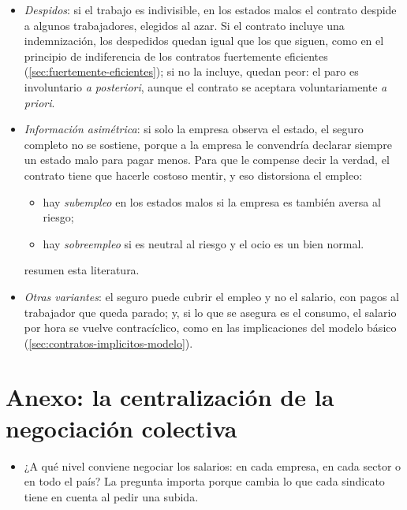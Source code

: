 \documentclass[11pt]{article}
\begin{document}
\begin{itemize}
\item \emph{Despidos}: si el trabajo es indivisible, en los estados malos el contrato despide a algunos trabajadores, elegidos al azar\nocite{Azariadis1975Implicit}. Si el contrato incluye una indemnización, los despedidos quedan igual que los que siguen, como en el principio de indiferencia de los contratos fuertemente eficientes (\ref{sec:fuertemente-eficientes}); si no la incluye, quedan peor: el paro es involuntario \emph{a posteriori}, aunque el contrato se aceptara voluntariamente \emph{a priori}\nocite{Rosen1985Implicit}.
\item \emph{Información asimétrica}: si solo la empresa observa el estado, el seguro completo no se sostiene, porque a la empresa le convendría declarar siempre un estado malo para pagar menos. Para que le compense decir la verdad, el contrato tiene que hacerle costoso mentir, y eso distorsiona el empleo:
  \begin{itemize}
  \item hay \emph{subempleo} en los estados malos si la empresa es también aversa al riesgo\nocite{GrossmanHart1981Implicit,Azariadis1983Employment};
  \item hay \emph{sobreempleo} si es neutral al riesgo y el ocio es un bien normal\nocite{GreenKahn1983Wage}.
  \end{itemize}
  \textcite{AzariadisStiglitz1983Implicit} resumen esta literatura.
\item \emph{Otras variantes}: el seguro puede cubrir el empleo y no el salario, con pagos al trabajador que queda parado; y, si lo que se asegura es el consumo, el salario por hora se vuelve contracíclico, como en las implicaciones del modelo básico (\ref{sec:contratos-implicitos-modelo}).
\end{itemize}

\section{Anexo: la centralización de la negociación colectiva}\label{anexo:centralizacion}

\begin{itemize}
\item ¿A qué nivel conviene negociar los salarios: en cada empresa, en cada sector o en todo el país? La pregunta importa porque cambia lo que cada sindicato tiene en cuenta al pedir una subida.
\end{itemize}
\end{document}
